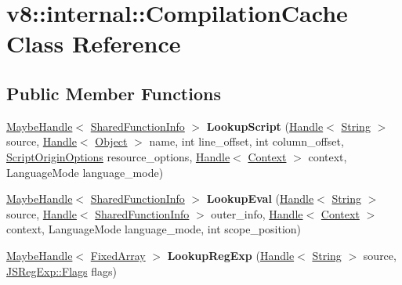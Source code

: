 \hypertarget{classv8_1_1internal_1_1_compilation_cache}{}\section{v8\+:\+:internal\+:\+:Compilation\+Cache Class Reference}
\label{classv8_1_1internal_1_1_compilation_cache}
\subsection*{Public Member Functions}
\begin{DoxyCompactItemize}
\item 
\hyperlink{classv8_1_1internal_1_1_maybe_handle}{Maybe\+Handle}$<$ \hyperlink{classv8_1_1internal_1_1_shared_function_info}{Shared\+Function\+Info} $>$ {\bfseries Lookup\+Script} (\hyperlink{classv8_1_1internal_1_1_handle}{Handle}$<$ \hyperlink{classv8_1_1internal_1_1_string}{String} $>$ source, \hyperlink{classv8_1_1internal_1_1_handle}{Handle}$<$ \hyperlink{classv8_1_1internal_1_1_object}{Object} $>$ name, int line\+\_\+offset, int column\+\_\+offset, \hyperlink{classv8_1_1_script_origin_options}{Script\+Origin\+Options} resource\+\_\+options, \hyperlink{classv8_1_1internal_1_1_handle}{Handle}$<$ \hyperlink{classv8_1_1internal_1_1_context}{Context} $>$ context, Language\+Mode language\+\_\+mode)\hypertarget{classv8_1_1internal_1_1_compilation_cache_aa0b60eddb9c60523fe8b053fa3def74d}{}\label{classv8_1_1internal_1_1_compilation_cache_aa0b60eddb9c60523fe8b053fa3def74d}

\item 
\hyperlink{classv8_1_1internal_1_1_maybe_handle}{Maybe\+Handle}$<$ \hyperlink{classv8_1_1internal_1_1_shared_function_info}{Shared\+Function\+Info} $>$ {\bfseries Lookup\+Eval} (\hyperlink{classv8_1_1internal_1_1_handle}{Handle}$<$ \hyperlink{classv8_1_1internal_1_1_string}{String} $>$ source, \hyperlink{classv8_1_1internal_1_1_handle}{Handle}$<$ \hyperlink{classv8_1_1internal_1_1_shared_function_info}{Shared\+Function\+Info} $>$ outer\+\_\+info, \hyperlink{classv8_1_1internal_1_1_handle}{Handle}$<$ \hyperlink{classv8_1_1internal_1_1_context}{Context} $>$ context, Language\+Mode language\+\_\+mode, int scope\+\_\+position)\hypertarget{classv8_1_1internal_1_1_compilation_cache_aac09f220d56fde389f834fcfcc0141d4}{}\label{classv8_1_1internal_1_1_compilation_cache_aac09f220d56fde389f834fcfcc0141d4}

\item 
\hyperlink{classv8_1_1internal_1_1_maybe_handle}{Maybe\+Handle}$<$ \hyperlink{classv8_1_1internal_1_1_fixed_array}{Fixed\+Array} $>$ {\bfseries Lookup\+Reg\+Exp} (\hyperlink{classv8_1_1internal_1_1_handle}{Handle}$<$ \hyperlink{classv8_1_1internal_1_1_string}{String} $>$ source, \hyperlink{classv8_1_1base_1_1_flags}{J\+S\+Reg\+Exp\+::\+Flags} flags)\hypertarget{classv8_1_1internal_1_1_compilation_cache_a3936c774ccd71fa0be44b4c01c234e9b}{}\label{classv8_1_1internal_1_1_compilation_cache_a3936c774ccd71fa0be44b4c01c234e9b}


\end{DoxyCompactItemize}

